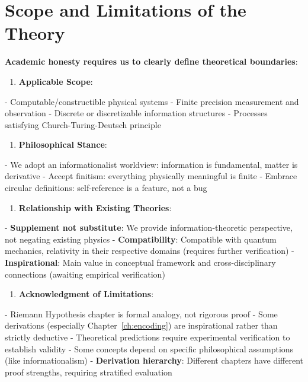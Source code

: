 \section{Scope and Limitations of the Theory}
\label{sec:ch08_conclusion:scope-and-limitations-of-the-theory}

\textbf{Academic honesty requires us to clearly define theoretical boundaries}:

\begin{enumerate}
\item \textbf{Applicable Scope}:
\end{enumerate}
   - Computable/constructible physical systems
   - Finite precision measurement and observation
   - Discrete or discretizable information structures
   - Processes satisfying Church-Turing-Deutsch principle

\begin{enumerate}
\item \textbf{Philosophical Stance}:
\end{enumerate}
   - We adopt an informationalist worldview: information is fundamental, matter is derivative
   - Accept finitism: everything physically meaningful is finite
   - Embrace circular definitions: self-reference is a feature, not a bug

\begin{enumerate}
\item \textbf{Relationship with Existing Theories}:
\end{enumerate}
   - \textbf{Supplement not substitute}: We provide information-theoretic perspective, not negating existing physics
   - \textbf{Compatibility}: Compatible with quantum mechanics, relativity in their respective domains (requires further verification)
   - \textbf{Inspirational}: Main value in conceptual framework and cross-disciplinary connections (awaiting empirical verification)

\begin{enumerate}
\item \textbf{Acknowledgment of Limitations}:
\end{enumerate}
   - Riemann Hypothesis chapter is formal analogy, not rigorous proof
   - Some derivations (especially Chapter~\ref{ch:encoding}) are inspirational rather than strictly deductive
   - Theoretical predictions require experimental verification to establish validity
   - Some concepts depend on specific philosophical assumptions (like informationalism)
   - \textbf{Derivation hierarchy}: Different chapters have different proof strengths, requiring stratified evaluation

